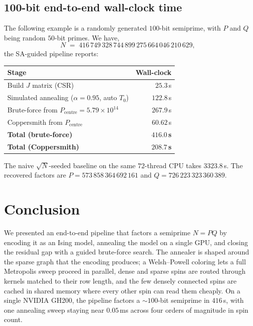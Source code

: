 \documentclass[pdflatex,sn-apa]{sn-jnl}%
\theoremstyle{thmstyleone}%
\theoremstyle{thmstyletwo}%
\theoremstyle{thmstylethree}%
\begin{document}
\subsection{100-bit end-to-end wall-clock time}

The following example is a randomly generated $100$-bit semiprime, with $P$ and $Q$ being random $50$-bit primes. We have,
\[
  N \;=\; 416\,749\,328\,744\,899\,275\,664\,046\,210\,629,
\]
the SA-guided pipeline reports:
\begin{center}
\begin{tabular}{lr}
  \toprule
  Stage & Wall-clock \\
  \midrule
  Build $J$ matrix (CSR)              & $25.3$\,s \\
  Simulated annealing ($\alpha = 0.95$, auto $T_0$) & $122.8$\,s \\
  \midrule
  Brute-force from $P_{\mathrm{centre}} = 5.79 \times 10^{14}$ & $267.9$\,s \\
  Coppersmith from $P_{\mathrm{centre}}$ & $60.62$\,s \\
  \midrule
  \textbf{Total (brute-force)}        & $\mathbf{416.0}$\,\textbf{s} \\
  \textbf{Total (Coppersmith)}        & $\mathbf{208.7}$\,\textbf{s} \\
  \bottomrule
\end{tabular}
\end{center}
The naive $\sqrt{N}$-seeded baseline on the same $72$-thread CPU takes $3323.8$\,s. The recovered factors are $P = 573\,858\,364\,692\,161$ and $Q = 726\,223\,323\,360\,389$.

\section{Conclusion}\label{sec:conclusion}

We presented an end-to-end pipeline that factors a semiprime $N = PQ$ by encoding it as an Ising model, annealing the model on a single GPU, and closing the residual gap with a guided brute-force search. The annealer is shaped around the sparse graph that the encoding produces; a Welsh--Powell coloring lets a full Metropolis sweep proceed in parallel, dense and sparse spins are routed through kernels matched to their row length, and the few densely connected spins are cached in shared memory where every other spin can read them cheaply. On a single NVIDIA GH200, the pipeline factors a $\sim 100$-bit semiprime in $416$\,s, with one annealing sweep staying near $0.05$\,ms across four orders of magnitude in spin count.
\end{document}
